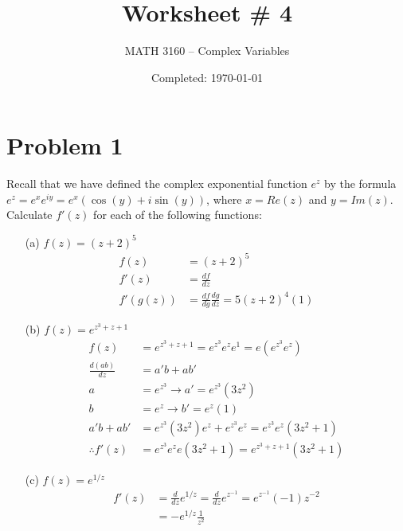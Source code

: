 \documentclass{article}
\title{Worksheet \# 4}
\author{
	MATH 3160 -- Complex Variables\\
	\myauthor
}
\date{Completed: \today}
\newcommand{\der}[2]{\frac{d#1}{d#2}}
\begin{document}
\maketitle %


\section*{Problem 1}
Recall that we have defined the complex exponential function $e^z$ by the formula $e^z = e^xe^{iy} = e^x(\cos{(y)} + i \sin{(y)})$, where $x = Re(z)$ and $y = Im(z)$.
\\

Calculate $f'(z)$ for each of the following functions:

\begin{enumerate}
	\item[(a)] $f (z) = (z + 2)^5$
		\begin{align*}
			f (z)    & = (z + 2)^5                           \\
			f'(z)    & = \der{f}{z}                          \\
			f'(g(z)) & = \der{f}{g}\der{g}{z} =  5(z+2)^4(1)
		\end{align*}
	\item[(b)] $f (z) = e^{z^3+z+1}$
		\begin{align*}
			f(z)             & = e^{z^3+z+1} = e^{z^3}e^{z}e^{1} = e(e^{z^3}e^{z})  \\
			\der{(ab)}{z}    & = a'b+ab'                                          \\
			a                & = e^{z^3} \to a' = e^{z^3}(3z^2)                    \\
			b                & = e^{z} \to b' = e^z(1)                             \\
			a'b+ab'          & = e^{z^3}(3z^2)e^z+e^{z^3}e^z = e^{z^3}e^z(3z^2 + 1) \\
			\therefore f'(z) & = e^{z^3}e^ze(3z^2 + 1) = e^{z^3+z+1}(3z^2 + 1)
		\end{align*}
	\item[(c)] $f (z) = e^{1/z}$
		\begin{align*}
			f'(z) & = \der{}{z}e^{1/z} = \der{}{z}e^{z^{-1}} = e^{z^{-1}}(-1)z^{-2} \\
			      & = -e^{1/z}\frac{1}{z^2}
		\end{align*}
\end{enumerate}
\end{document}
